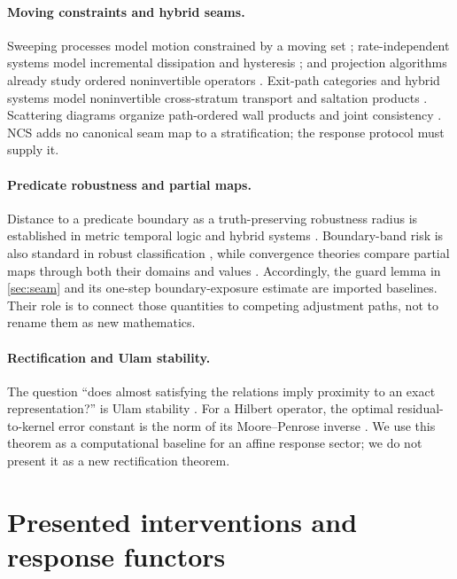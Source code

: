 \documentclass[11pt]{article}
\theoremstyle{definition}
\theoremstyle{remark}
\begin{document}
\paragraph{Moving constraints and hybrid seams.}
Sweeping processes model motion constrained by a moving set
\citep{moreau1977}; rate-independent systems model incremental dissipation and
hysteresis \citep{mielke2004}; and projection algorithms already study
ordered noninvertible operators \citep{bauschke1996}. Exit-path categories and
hybrid systems model noninvertible cross-stratum transport and saltation
products \citep{treumann2009,woolf2009,burden2016,kong2024}. Scattering
diagrams organize path-ordered wall products and joint consistency
\citep{gross2018}. NCS adds no canonical seam map to a stratification; the
response protocol must supply it.

\paragraph{Predicate robustness and partial maps.}
Distance to a predicate boundary as a truth-preserving robustness radius is
established in metric temporal logic and hybrid systems
\citep{fainekos2009}. Boundary-band risk is also standard in robust
classification \citep{zhang2019trades}, while convergence theories compare
partial maps through both their domains and values \citep{beer2014}.
Accordingly, the guard lemma in \cref{sec:seam} and its one-step
boundary-exposure estimate are imported baselines. Their role is to connect
those quantities to competing adjustment paths, not to rename them as new
mathematics.

\paragraph{Rectification and Ulam stability.}
The question ``does almost satisfying the relations imply proximity to an
exact representation?'' is Ulam stability
\citep{burger2010,gowers2015,voiculescu1983,becker2023,arzhantseva2015}.
For a Hilbert operator, the optimal residual-to-kernel error constant is the
norm of its Moore--Penrose inverse \citep{huang2012}. We use this theorem as a
computational baseline for an affine response sector; we do not present it as
a new rectification theorem.

\section{Presented interventions and response functors}
\end{document}
